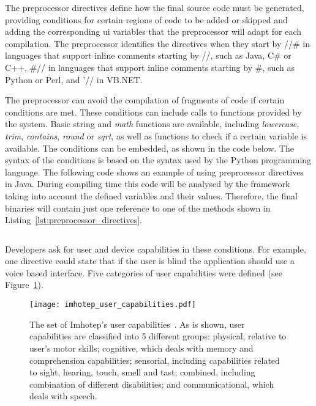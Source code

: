 The preprocessor directives define how the final source code must be generated, 
providing conditions for certain regions of code to be added or skipped and 
adding the corresponding \ac{ui} variables that the preprocessor will adapt for each
compilation. The preprocessor identifies the directives when they start by //\#
in languages that support inline comments starting by //, such as Java, C\# or
C++, \#// in languages that support inline comments starting by \#, such as 
Python or Perl, and '// in VB.NET.

The preprocessor can avoid the compilation of fragments of code if certain 
conditions are met. These conditions can include calls to functions provided 
by the system. Basic string and \textit{math} functions are available, including
\textit{lowercase}, \textit{trim}, \textit{contains}, \textit{round} or 
\textit{sqrt}, as well as functions to check if a certain variable is 
available. The conditions can be embedded, as shown in the code below. The 
syntax of the conditions is  based on the syntax used by the Python programming 
language. The following code shows an example of using preprocessor directives 
in Java. During compiling time this code will be analysed by the framework 
taking into account the defined variables and their values. Therefore, the final 
binaries will contain just one reference to one of the methods shown in 
Listing~\ref{lst:preprocessor_directives}.


\inputminted[linenos=true, fontsize=\footnotesize, frame=lines]{python}{5_experiments_and_results/preprocessor_directives.py}


Developers ask for user and device capabilities in these conditions. For 
example, one directive could state that if the user is blind the application 
should use a voice based interface. Five categories of user capabilities were 
defined (see Figure~\ref{fig:imhotep_user_capabilities}).


\begin{figure}
\centering
\texttt{[image: imhotep\_user\_capabilities.pdf]}
\caption{The set of Imhotep's user capabilities~\citep{imhotep_website}. As is
shown, user capabilities are classified into 5 different groups: physical, 
relative to user's motor skills; cognitive, which deals with memory and 
comprehension capabilities; sensorial, including capabilities related to 
sight, hearing, touch, smell and tast; combined, including combination of 
different disabilities; and communicational, which deals with speech.}
\label{fig:imhotep_user_capabilities}
\end{figure}


